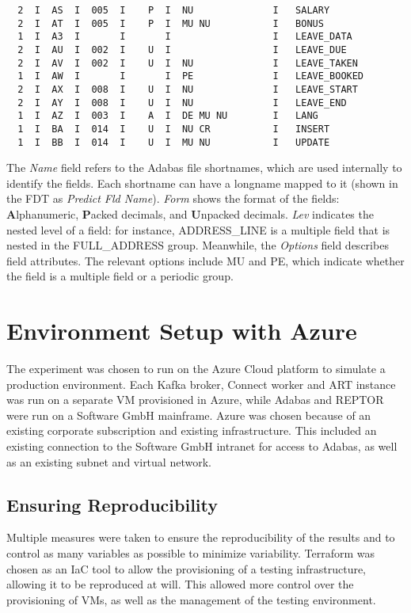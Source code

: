 \begin{verbatim}
  2  I  AS  I  005  I    P  I  NU              I   SALARY                    
  2  I  AT  I  005  I    P  I  MU NU           I   BONUS                     
  1  I  A3  I       I       I                  I   LEAVE_DATA                
  2  I  AU  I  002  I    U  I                  I   LEAVE_DUE
  2  I  AV  I  002  I    U  I  NU              I   LEAVE_TAKEN               
  1  I  AW  I       I       I  PE              I   LEAVE_BOOKED              
  2  I  AX  I  008  I    U  I  NU              I   LEAVE_START               
  2  I  AY  I  008  I    U  I  NU              I   LEAVE_END                 
  1  I  AZ  I  003  I    A  I  DE MU NU        I   LANG                      
  1  I  BA  I  014  I    U  I  NU CR           I   INSERT                    
  1  I  BB  I  014  I    U  I  MU NU           I   UPDATE                    
\end{verbatim}

The \textit{Name} field refers to the Adabas file shortnames, which are used internally to identify the fields. Each shortname can have a longname mapped to it (shown in the \ac{FDT} as \textit{Predict Fld Name}). \textit{Form} shows the format of the fields: \textbf{A}lphanumeric, \textbf{P}acked decimals, and \textbf{U}npacked decimals. \textit{Lev} indicates the nested level of a field: for instance, ADDRESS\_LINE is a multiple field that is nested in the FULL\_ADDRESS group. Meanwhile, the \textit{Options} field describes field attributes. The relevant options include MU and PE, which indicate whether the field is a multiple field or a periodic group.

\section{Environment Setup with Azure}
\label{ch05:methodology:environmentsetup}
The experiment was chosen to run on the Azure Cloud platform to simulate a production environment. Each Kafka broker, Connect worker and \ac{ART} instance was run on a separate \ac{VM} provisioned in Azure, while Adabas and \ac{REPTOR} were run on a Software GmbH mainframe. Azure was chosen because of an existing corporate subscription and existing infrastructure. This included an existing connection to the Software GmbH intranet for access to Adabas, as well as an existing subnet and virtual network.

\subsection{Ensuring Reproducibility}
Multiple measures were taken to ensure the reproducibility of the results and to control as many variables as possible to minimize variability. Terraform was chosen as an \ac{IaC} tool to allow the provisioning of a testing infrastructure, allowing it to be reproduced at will. This allowed more control over the provisioning of \ac{VM}s, as well as the management of the testing environment.


